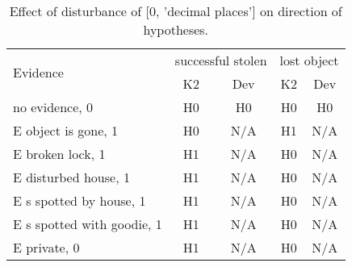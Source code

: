 \begin{table}\begin{tabular}{l|cc|cc}\toprule\multirow{2}{*}{Evidence} & \multicolumn{2}{c}{successful stolen}& \multicolumn{2}{c}{lost object}\\& {K2} & {Dev}& {K2} & {Dev}\\\midrule
no evidence, 0 & H0&H0&H0&H0\\E object is gone, 1 & \cellcolor{Bittersweet}H0&\cellcolor{Bittersweet}N/A&\cellcolor{Bittersweet}H1&\cellcolor{Bittersweet}N/A\\E broken lock, 1 & \cellcolor{Bittersweet}H1&\cellcolor{Bittersweet}N/A&\cellcolor{Bittersweet}H0&\cellcolor{Bittersweet}N/A\\E disturbed house, 1 & \cellcolor{Bittersweet}H1&\cellcolor{Bittersweet}N/A&\cellcolor{Bittersweet}H0&\cellcolor{Bittersweet}N/A\\E s spotted by house, 1 & \cellcolor{Bittersweet}H1&\cellcolor{Bittersweet}N/A&\cellcolor{Bittersweet}H0&\cellcolor{Bittersweet}N/A\\E s spotted with goodie, 1 & \cellcolor{Bittersweet}H1&\cellcolor{Bittersweet}N/A&\cellcolor{Bittersweet}H0&\cellcolor{Bittersweet}N/A\\E private, 0 & \cellcolor{Bittersweet}H1&\cellcolor{Bittersweet}N/A&\cellcolor{Bittersweet}H0&\cellcolor{Bittersweet}N/A\\\bottomrule\end{tabular}\caption{Effect of disturbance of [0, 'decimal places'] on direction of hypotheses.}\end{table}